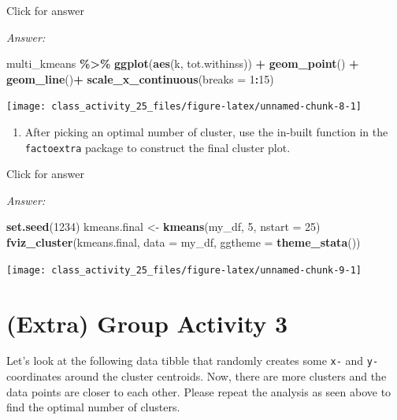 \documentclass[
]{book}
\newenvironment{Shaded}{\begin{snugshade}}{\end{snugshade}}
\newcommand{\AttributeTok}[1]{\textcolor[rgb]{0.13,0.29,0.53}{#1}}
\newcommand{\DecValTok}[1]{\textcolor[rgb]{0.00,0.00,0.81}{#1}}
\newcommand{\FunctionTok}[1]{\textcolor[rgb]{0.13,0.29,0.53}{\textbf{#1}}}
\newcommand{\NormalTok}[1]{#1}
\newcommand{\OtherTok}[1]{\textcolor[rgb]{0.56,0.35,0.01}{#1}}
\newcommand{\SpecialCharTok}[1]{\textcolor[rgb]{0.81,0.36,0.00}{\textbf{#1}}}
\providecommand{\tightlist}{%
  \setlength{\itemsep}{0pt}\setlength{\parskip}{0pt}}
\begin{document}
Click for answer

\emph{Answer:}

\begin{Shaded}
\begin{Highlighting}[]
\NormalTok{multi\_kmeans }\SpecialCharTok{\%\textgreater{}\%}
  \FunctionTok{ggplot}\NormalTok{(}\FunctionTok{aes}\NormalTok{(k, tot.withinss)) }\SpecialCharTok{+}
  \FunctionTok{geom\_point}\NormalTok{() }\SpecialCharTok{+}
  \FunctionTok{geom\_line}\NormalTok{()}\SpecialCharTok{+}
  \FunctionTok{scale\_x\_continuous}\NormalTok{(}\AttributeTok{breaks =} \DecValTok{1}\SpecialCharTok{:}\DecValTok{15}\NormalTok{) }
\end{Highlighting}
\end{Shaded}

\texttt{[image: class\_activity\_25\_files/figure-latex/unnamed-chunk-8-1]}

\begin{enumerate}
\def\labelenumi{\alph{enumi}.}
\setcounter{enumi}{2}
\tightlist
\item
  After picking an optimal number of cluster, use the in-built function in the \texttt{factoextra} package to construct the final cluster plot.
\end{enumerate}

Click for answer

\emph{Answer:}

\begin{Shaded}
\begin{Highlighting}[]
\FunctionTok{set.seed}\NormalTok{(}\DecValTok{1234}\NormalTok{)}
\NormalTok{kmeans.final }\OtherTok{\textless{}{-}} \FunctionTok{kmeans}\NormalTok{(my\_df, }\DecValTok{5}\NormalTok{, }\AttributeTok{nstart =} \DecValTok{25}\NormalTok{)}
\FunctionTok{fviz\_cluster}\NormalTok{(kmeans.final, }\AttributeTok{data =}\NormalTok{ my\_df, }\AttributeTok{ggtheme =} \FunctionTok{theme\_stata}\NormalTok{())}
\end{Highlighting}
\end{Shaded}

\texttt{[image: class\_activity\_25\_files/figure-latex/unnamed-chunk-9-1]}

\hypertarget{extra-group-activity-3}{%
\section{(Extra) Group Activity 3}\label{extra-group-activity-3}}

Let's look at the following data tibble that randomly creates some \texttt{x-} and \texttt{y-} coordinates around the cluster centroids. Now, there are more clusters and the data points are closer to each other. Please repeat the analysis as seen above to find the optimal number of clusters.
\end{document}
